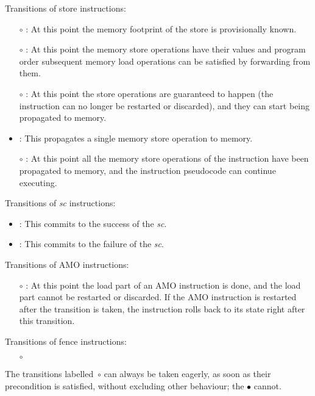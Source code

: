 \noindent Transitions of store instructions:
\begin{itemize}
\item[$\circ$] : At this point the memory footprint of the store is provisionally known.
\item[$\circ$] : At this point the memory store operations have their values and program order subsequent memory load operations can be satisfied by forwarding from them.
\item[$\circ$] : At this point the store operations are guaranteed to happen (the instruction can no longer be restarted or discarded), and they can start being propagated to memory.
\item {}: This propagates a single memory store operation to memory.
\item[$\circ$] : At this point all the memory store operations of the instruction have been propagated to memory, and the instruction pseudocode can continue executing.
\end{itemize}

\noindent Transitions of {\em  sc} instructions:
\begin{itemize}
\item {}: This commits to the success of the {\em sc}.
\item {}: This commits to the failure of the {\em sc}.
\end{itemize}

\noindent Transitions of AMO instructions:
\begin{itemize}
\item[$\circ$] : At this point the load part of an AMO instruction is done, and the load part cannot be restarted or discarded. If the AMO instruction is restarted after the transition is taken, the instruction rolls back to its state right after this transition.
\end{itemize}

\noindent Transitions of fence instructions:
\begin{itemize}
\item[$\circ$] 
\end{itemize}

\begin{commentary}
The transitions labelled~$\circ$ can always be taken eagerly, as soon as their precondition is satisfied, without excluding other behaviour; the $\bullet$ cannot.
\end{commentary}

